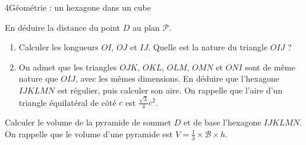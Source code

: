 \begin{exoBac}{4}{Géométrie : un hexagone dans un cube}
\begin{questions}[start=3]
    En déduire la distance du point $D$ au plan $\mathcal{P}$.
  \item \begin{enumerate}[label=\alph*),leftmargin=1.4em,itemsep=0.4mm,topsep=0.4mm]
      \item Calculer les longueurs $OI$, $OJ$ et $IJ$. Quelle est la nature du triangle $OIJ$ ?
      \item On admet que les triangles $OJK$, $OKL$, $OLM$, $OMN$ et $ONI$ sont de même nature que $OIJ$, avec les mêmes dimensions. En
        déduire que l'hexagone $IJKLMN$ est régulier, puis calculer son aire. On rappelle que l'aire d'un triangle équilatéral de côté
        $c$ est $\frac{\sqrt3}{4}c^{2}$.
    \end{enumerate}
  \item Calculer le volume de la pyramide de sommet $D$ et de base l'hexagone $IJKLMN$. On rappelle que le volume d'une pyramide est
    $V=\frac13\times\mathcal{B}\times h$.
\end{questions}
\end{exoBac}

